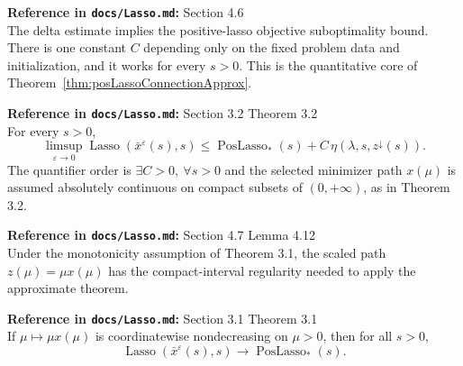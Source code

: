 \begin{lemma}\label{lem:positiveEnergyEstimate}
  \textbf{Reference in \texttt{docs/Lasso.md}:} Section 4.6\\
The delta estimate implies the positive-lasso objective suboptimality bound.
There is one constant $C$ depending only on the fixed problem data and
initialization, and it works for every $s>0$.
This is the quantitative core of Theorem~\ref{thm:posLassoConnectionApprox}.
\end{lemma}

\begin{theorem}\label{thm:posLassoConnectionApprox}
  \textbf{Reference in \texttt{docs/Lasso.md}:} Section 3.2 Theorem 3.2\\
For every $s>0$,
\[
  \limsup_{\varepsilon\to 0}
  \operatorname{Lasso}(\bar x^\varepsilon(s),s)
  \le
  \operatorname{PosLasso}_*(s)
  + C\,\eta(\lambda,s,z^\downarrow(s)).
\]
The quantifier order is $\exists C>0,\ \forall s>0$ and the selected minimizer
path $x(\mu)$ is assumed absolutely continuous on compact subsets of
$(0,+\infty)$, as in Theorem 3.2.
\end{theorem}

\begin{lemma}\label{lem:monotonePositivePathRegular}
  \textbf{Reference in \texttt{docs/Lasso.md}:} Section 4.7 Lemma 4.12\\
Under the monotonicity assumption of Theorem 3.1, the scaled path
$z(\mu)=\mu x(\mu)$ has the compact-interval regularity needed to apply the
approximate theorem.
\end{lemma}

\begin{theorem}\label{thm:posLassoConnectionMonotone}
  \textbf{Reference in \texttt{docs/Lasso.md}:} Section 3.1 Theorem 3.1\\
If $\mu\mapsto \mu x(\mu)$ is coordinatewise nondecreasing on $\mu>0$, then
for all $s>0$,
\[
  \operatorname{Lasso}(\bar x^\varepsilon(s),s)
  \to
  \operatorname{PosLasso}_*(s).
\]
\end{theorem}

